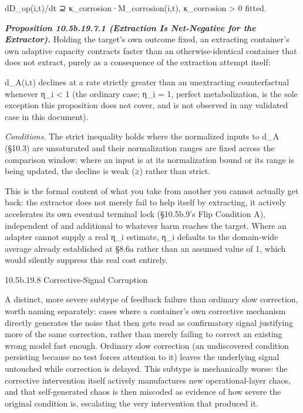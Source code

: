 \documentclass[
]{article}
\begin{document}
dD\_op(i,t)/dt ⊇ κ\_corrosion·M\_corrosion(i,t), κ\_corrosion
\textgreater{} 0 fitted.

\emph{\textbf{Proposition 10.5b.19.7.1 (Extraction Is Net-Negative for
the Extractor).}} Holding the target's own outcome fixed, an extracting
container's own adaptive capacity contracts faster than an
otherwise-identical container that does not extract, purely as a
consequence of the extraction attempt itself:

d\_A(i,t) declines at a rate strictly greater than an unextracting
counterfactual whenever η\_i \textless{} 1 (the ordinary case; η\_i = 1,
perfect metabolization, is the sole exception this proposition does not
cover, and is not observed in any validated case in this document).

\emph{Conditions.} The strict inequality holds where the normalized
inputs to d\_A (§10.3) are unsaturated and their normalization ranges
are fixed across the comparison window; where an input is at its
normalization bound or its range is being updated, the decline is weak
(≥) rather than strict.

This is the formal content of what you take from another you cannot
actually get back: the extractor does not merely fail to help itself by
extracting, it actively accelerates its own eventual terminal lock
(§10.5b.9's Flip Condition A), independent of and additional to whatever
harm reaches the target. Where an adapter cannot supply a real η\_i
estimate, η\_i defaults to the domain-wide average already established
at §8.6a rather than an assumed value of 1, which would silently
suppress this real cost entirely.

10.5b.19.8 Corrective-Signal Corruption

A distinct, more severe subtype of feedback failure than ordinary slow
correction, worth naming separately: cases where a container's own
corrective mechanism directly generates the noise that then gets read as
confirmatory signal justifying more of the same correction, rather than
merely failing to correct an existing wrong model fast enough. Ordinary
slow correction (an undiscovered condition persisting because no test
forces attention to it) leaves the underlying signal untouched while
correction is delayed. This subtype is mechanically worse: the
corrective intervention itself actively manufactures new
operational-layer chaos, and that self-generated chaos is then miscoded
as evidence of how severe the original condition is, escalating the very
intervention that produced it.
\end{document}
